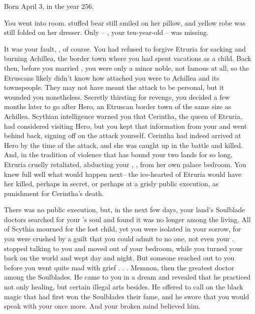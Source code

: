 \documentclass[char]{Kos}
\begin{document}
\name{\cScythiaQueen{}}


Born April 3, in the year 256.

You went into \cFugitive{\their} room. \cFugitive{\Their} stuffed bear still smiled on her pillow, and \cFugitive{\their} yellow robe was still folded on her dresser. Only \cFugitive{\they}-- \cFugitive{}, your ten-year-old  \cFugitive{\offspring}-- was missing.

It was your fault, \cScythiaKing{}, of course. You had refused to forgive Etruria for sacking and burning Achillea, the border town where you had spent vacations as a child. Back then, before you married \cScythiaKing{}, you were only a minor noble, not famous at all, so the Etruscans likely didn't know how attached you were to Achillea and its townspeople. They may not have meant the attack to be personal, but it wounded you nonetheless. Secretly thirsting for revenge, you decided a few months later to go after Hero, an Etruscan border town of the same size as Achillea. Scythian intelligence warned you that Cerintha, the queen of Etruria, had considered visiting Hero, but you kept that information from your \cScythiaKing{\spouse} and went behind \cScythiaKing{\their} back, signing off on the attack yourself. Cerintha had indeed arrived at Hero by the time of the attack, and she was caught up in the battle and killed. And, in the tradition of violence that has bound your two lands for so long, Etruria cruelly retaliated, abducting your \cFugitive{\offspring}, \cFugitive{}, from her own palace bedroom. You knew full well what would happen next-- the ice-hearted \cEtruriaKing{\Monarch} of Etruria would have her killed, perhaps in secret, or perhaps at a grisly public execution, as punishment for Cerintha's death.

There was no public execution, but, in the next few days, your land's Soulblade doctors searched for your \cFugitive{\offspring}'s soul and found it was no longer among the living. All of Scythia mourned for the lost child, yet you were isolated in your sorrow, for you were crushed by a guilt that you could admit to no one, not even your \cScythiaKing{\spouse}. \cScythiaKing{\They} stopped talking to you and moved out of your bedroom, while you turned your back on the world and wept day and night. But someone reached out to you before you went quite mad with grief . . . Memnon, then the greatest doctor among the Soulblades. He came to you in a dream and revealed that he practiced not only healing, but certain illegal arts besides. He offered to call on the black magic that had first won the Soulblades their fame, and he swore that you would speak with your \cFugitive{\offspring} once more. And your broken mind believed him.
\end{document}
